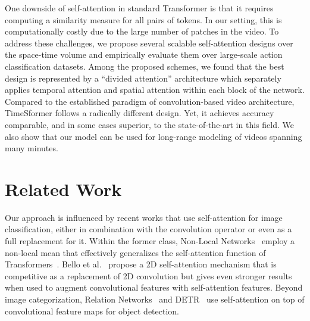 \documentclass{article}
\begin{document}
One downside of self-attention in standard Transformer is that it requires computing a similarity measure for all pairs of tokens. In our setting, this is computationally costly due to the large number of patches in the video. To address these challenges, we propose several scalable self-attention designs over the space-time volume and empirically evaluate them over large-scale action classification datasets. Among the proposed schemes, we found that the best design is represented by a ``divided attention'' architecture which separately applies temporal attention and spatial attention within each block of the network. Compared to the established paradigm of convolution-based video architecture, TimeSformer follows a radically different design. Yet, it achieves accuracy comparable, and in some cases superior, to the state-of-the-art in this field. We also show that our model can be used for long-range modeling of videos spanning many minutes.






















\section{Related Work}



Our approach is influenced by recent works that use self-attention for image classification, either in combination with the convolution operator or even as a full replacement for it. Within the former class, Non-Local Networks~\cite{NLN} employ a non-local mean that effectively generalizes the self-attention function of Transformers~\cite{Vaswani:2017}. Bello et al.~\cite{BelloEtAl} propose a 2D self-attention mechanism that is competitive as a replacement of 2D convolution but gives even stronger results when used to augment convolutional features with self-attention features. Beyond image categorization, Relation Networks~\cite{Hu:CVPR2018} and DETR~\cite{DETR} use self-attention on top of convolutional feature maps for object detection. 
\end{document}
